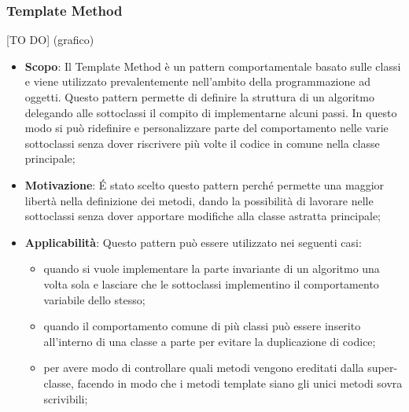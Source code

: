 		\subsubsection{Template Method} %
		\label{ssub:template_method}
		[TO DO] (grafico)
		\begin{itemize}
			\item \textbf{Scopo}: Il Template Method è un pattern comportamentale basato sulle classi e viene utilizzato prevalentemente nell'ambito della programmazione ad oggetti.
Questo pattern permette di definire la struttura di un algoritmo delegando alle sottoclassi il compito di implementarne alcuni passi. In questo modo si può ridefinire e personalizzare parte del comportamento nelle varie sottoclassi senza dover riscrivere più volte il codice in comune nella classe principale;
			\item \textbf{Motivazione}: \'E stato scelto questo pattern perché permette una maggior libertà nella definizione dei metodi, dando la possibilità di lavorare nelle sottoclassi senza dover apportare modifiche alla classe astratta principale;
			\item \textbf{Applicabilità}: Questo pattern può essere utilizzato nei seguenti casi:
			\begin{itemize}
			\item quando si vuole implementare la parte invariante di un algoritmo una volta sola e lasciare che le sottoclassi implementino il comportamento variabile dello stesso;
			\item quando il comportamento comune di più classi può essere inserito all'interno di una classe a parte per evitare la duplicazione di codice;
			\item per avere modo di controllare quali metodi vengono ereditati dalla super-classe, facendo in modo che i metodi template siano gli unici metodi sovra scrivibili;
			\end{itemize}

		\end{itemize}


		\newpage

